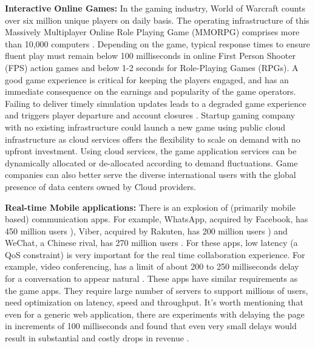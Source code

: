 \documentclass[journal]{IEEEtran}
\begin{document}
\textbf{Interactive Online Games:} In the gaming industry, World of Warcraft counts over six million unique players on daily basis. The operating infrastructure of this Massively Multiplayer Online Role Playing Game (MMORPG) comprises more than 10,000 computers \cite{nae2011dynamic}. Depending on the game, typical response times to ensure fluent play must remain below 100 milliseconds in online First Person Shooter (FPS) action games    \cite{beigbeder2004effects} and below 1-2 seconds for Role-Playing Games (RPGs). A good game experience is critical for keeping the players engaged, and has an immediate consequence on the earnings and popularity of the game operators. Failing to deliver timely simulation updates leads to a degraded game experience and triggers player departure and account closures    \cite{shaikh2006demand}. Startup gaming company with no existing infrastructure could launch a new game using public cloud infrastructure as cloud services offers the flexibility to scale on demand with no upfront investment. Using cloud services, the game application services can be dynamically allocated or de-allocated according to demand fluctuations. Game companies can also better serve the diverse international users with the global presence of data centers owned by Cloud providers.


\textbf{Real-time Mobile applications:} There is an explosion of (primarily mobile based) communication apps. For example, WhatsApp, acquired by Facebook, has  450 million users \cite{ref7}), Viber, acquired by Rakuten, has 200 million users \cite{ref8}) and WeChat, a Chinese rival, has 270 million users \cite{ref9}. For these apps, low latency (a QoS constraint) is very important for the real time collaboration experience. For example, video conferencing, has a limit of about 200 to 250 milliseconds delay for a conversation to appear natural \cite{weinman2011time}. These apps have similar requirements as the game apps. They require large number of servers to support millions of users, need optimization on latency, speed and throughput. It's worth mentioning that even for a generic web application, there are experiments with delaying the page in increments of 100 milliseconds and found that even very small delays would result in substantial and costly drops in revenue    \cite{weinman2011time}.
\end{document}
